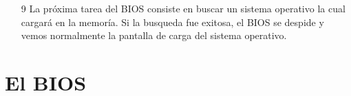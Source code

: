 \documentclass[12pt,oneside,a4paper]{article}
\begin{document}
\begin{enumerate}
	
	
	
	

	\item[9] La próxima tarea del BIOS consiste en buscar un sistema operativo
		la cual cargará en la memoría. Si la busqueda fue exitosa, el BIOS se despide
		y vemos normalmente la pantalla de carga del sistema operativo.

	\end{enumerate}

\section{El BIOS}{\label{sec:bios}}
\end{document}
